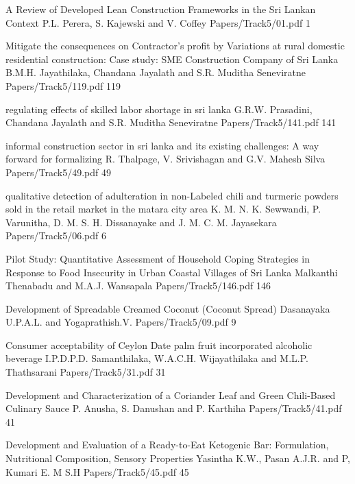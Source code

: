    \addpaper
    	{A Review of Developed Lean Construction Frameworks in the Sri Lankan Context}
   		 {P.L. Perera, S. Kajewski and V. Coffey} 
   		 {Papers/Track5/01.pdf}
        {1} 

          \addpaper
    	{Mitigate the consequences on Contractor's profit by Variations at rural domestic residential construction: Case study: SME Construction Company of Sri Lanka}
   		 {B.M.H. Jayathilaka, Chandana Jayalath and S.R. Muditha Seneviratne} 
   		 {Papers/Track5/119.pdf}
        {119}


           \addpaper
    	{regulating effects of skilled labor shortage in sri lanka}
   		 {G.R.W. Prasadini, Chandana Jayalath and S.R. Muditha Seneviratne} 
   		 {Papers/Track5/141.pdf}
        {141}


        

        \addpaper
    	{informal construction sector in sri lanka and its existing challenges: A way forward for formalizing}
   		 {R. Thalpage, V. Srivishagan and G.V. Mahesh Silva} 
   		 {Papers/Track5/49.pdf}
        {49}

     
          \addpaper
    	{qualitative detection of adulteration in non-Labeled chili and turmeric powders sold in the retail market in the matara city area}
   		 {K. M. N. K. Sewwandi, P. Varunitha, D. M. S. H. Dissanayake and
          J. M. C. M. Jayasekara} 
   		 {Papers/Track5/06.pdf}
        {6}


         \addpaper
    	{Pilot Study: Quantitative Assessment of Household Coping Strategies in Response to Food Insecurity in Urban Coastal Villages of Sri Lanka}
   		 {Malkanthi Thenabadu and M.A.J. Wansapala} 
   		 {Papers/Track5/146.pdf}
        {146}




            \addpaper
    	{Development of Spreadable Creamed Coconut (Coconut Spread)}
   		 {Dasanayaka U.P.A.L. and Yogaprathish.V.} 
   		 {Papers/Track5/09.pdf}
        {9}

        
          \addpaper
    	{Consumer acceptability of Ceylon Date palm fruit incorporated alcoholic beverage}
   		 {I.P.D.P.D. Samanthilaka, W.A.C.H. Wijayathilaka and M.L.P. Thathsarani} 
   		 {Papers/Track5/31.pdf}
        {31}
     
           \addpaper
    	{Development and Characterization of a Coriander Leaf and Green Chili-Based Culinary Sauce}
   		 {P. Anusha, S. Danushan and P. Karthiha} 
   		 {Papers/Track5/41.pdf}
        {41}

        
        \addpaper
    	{Development and Evaluation of a Ready-to-Eat Ketogenic Bar: Formulation, Nutritional Composition, Sensory Properties}
   		 {Yasintha K.W., Pasan A.J.R. and P, Kumari E. M S.H} 
   		 {Papers/Track5/45.pdf}
        {45}

